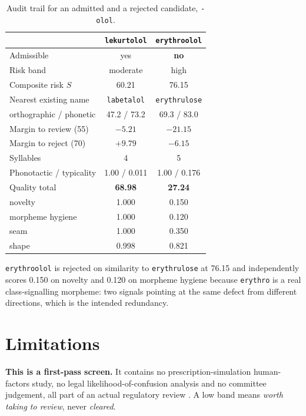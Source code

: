 \documentclass[conference]{IEEEtran}
\newcommand{\code}[1]{\texttt{\footnotesize #1}}
\begin{document}
\begin{table}[t]
\caption{Audit trail for an admitted and a rejected candidate, \textnormal{\texttt{-olol}}.}
\label{tab:audit}
\centering
\scriptsize
\setlength{\tabcolsep}{3.5pt}
\begin{tabular}{lcc}
\toprule
 & \code{lekurtolol} & \code{erythroolol} \\
\midrule
Admissible               & yes           & \textbf{no} \\
Risk band                & moderate      & high \\
Composite risk $S$       & 60.21         & 76.15 \\
Nearest existing name    & \code{labetalol} & \code{erythrulose} \\
\quad orthographic / phonetic & 47.2 / 73.2 & 69.3 / 83.0 \\
Margin to review (55)    & $-5.21$       & $-21.15$ \\
Margin to reject (70)    & $+9.79$       & $-6.15$ \\
Syllables                & 4             & 5 \\
Phonotactic / typicality & 1.00 / 0.011  & 1.00 / 0.176 \\
\midrule
Quality total            & \textbf{68.98} & \textbf{27.24} \\
\quad novelty            & 1.000         & 0.150 \\
\quad morpheme hygiene   & 1.000         & 0.120 \\
\quad seam               & 1.000         & 0.350 \\
\quad shape              & 0.998         & 0.821 \\
\bottomrule
\end{tabular}
\end{table}

\code{erythroolol} is rejected on similarity to \code{erythrulose} at 76.15 and
independently scores 0.150 on novelty and 0.120 on morpheme hygiene because
\code{erythro} is a real class-signalling morpheme: two signals pointing at the
same defect from different directions, which is the intended redundancy.

\section{Limitations}

\textbf{This is a first-pass screen.} It contains no prescription-simulation
human-factors study, no legal likelihood-of-confusion analysis and no committee
judgement, all part of an actual regulatory review
\cite{fdaguidance,emaguideline}. A low band means \emph{worth taking to
review}, never \emph{cleared}.
\end{document}
